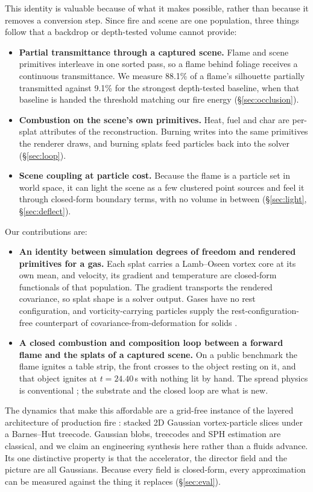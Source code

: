 \documentclass[acmtog,nonacm]{acmart}
\begin{document}
This identity is valuable because of what it makes possible, rather than because it removes a conversion step. Since fire and scene are one population, three things follow that a backdrop or depth-tested volume cannot provide:
\begin{itemize}
\item \textbf{Partial transmittance through a captured scene.} Flame and scene primitives interleave in one sorted pass, so a flame behind foliage receives a continuous transmittance. We measure 88.1\% of a flame's silhouette partially transmitted against 9.1\% for the strongest depth-tested baseline, when that baseline is handed the threshold matching our fire energy (\S\ref{sec:occlusion}).
\item \textbf{Combustion on the scene's own primitives.} Heat, fuel and char are per-splat attributes of the reconstruction. Burning writes into the same primitives the renderer draws, and burning splats feed particles back into the solver (\S\ref{sec:loop}).
\item \textbf{Scene coupling at particle cost.} Because the flame is a particle set in world space, it can light the scene as a few clustered point sources and feel it through closed-form boundary terms, with no volume in between (\S\ref{sec:light}, \S\ref{sec:deflect}).
\end{itemize}
Our contributions are:
\begin{itemize}
\item \textbf{An identity between simulation degrees of freedom and rendered primitives for a gas.} Each splat carries a Lamb--Oseen vortex core at its own mean, and velocity, its gradient and temperature are closed-form functionals of that population. The gradient transports the rendered covariance, so splat shape is a solver output. Gases have no rest configuration, and vorticity-carrying particles supply the rest-configuration-free counterpart of covariance-from-deformation for solids \cite{xie2024}.
\item \textbf{A closed combustion and composition loop between a forward flame and the splats of a captured scene.} On a public benchmark the flame ignites a table strip, the front crosses to the object resting on it, and that object ignites at $t=24.40$\,s with nothing lit by hand. The spread physics is conventional \cite{pirk2017,hadrich2021}; the substrate and the closed loop are what is new.
\end{itemize}
The dynamics that make this affordable are a grid-free instance of the layered architecture of production fire \cite{horvath2009}: stacked 2D Gaussian vortex-particle slices under a Barnes--Hut treecode. Gaussian blobs, treecodes and SPH estimation are classical, and we claim an engineering synthesis here rather than a fluids advance. Its one distinctive property is that the accelerator, the director field and the picture are all Gaussians. Because every field is closed-form, every approximation can be measured against the thing it replaces (\S\ref{sec:eval}).
\end{document}
